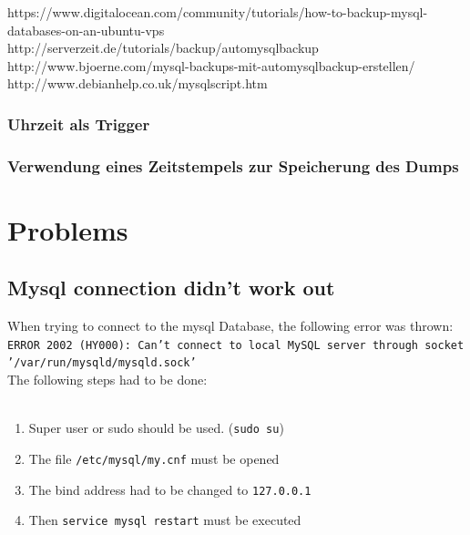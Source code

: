 \documentclass[10pt]{article}
\begin{document}
https://www.digitalocean.com/community/tutorials/how-to-backup-mysql-databases-on-an-ubuntu-vps
http://serverzeit.de/tutorials/backup/automysqlbackup
http://www.bjoerne.com/mysql-backups-mit-automysqlbackup-erstellen/
http://www.debianhelp.co.uk/mysqlscript.htm

\subsubsection{Uhrzeit als Trigger}
\subsubsection{Verwendung eines Zeitstempels zur Speicherung des Dumps}


\newpage
\section{Problems}

\subsection{Mysql connection didn't work out}
When trying to connect to the mysql Database, the following error was thrown:
\texttt{ERROR 2002 (HY000): Can't connect to local MySQL server through socket '/var/run/mysqld/mysqld.sock'} \\
The following steps had to be done: \\
\\ 
\begin{enumerate}
\item Super user or sudo should be used. (\texttt{sudo su}) 
\item The file \texttt{/etc/mysql/my.cnf} must be opened 
\item The bind address had to be changed to \texttt{127.0.0.1}
\item Then \texttt{service mysql restart} must be executed
\end{enumerate}
\cite{mysqlProblem1}
\end{document}
